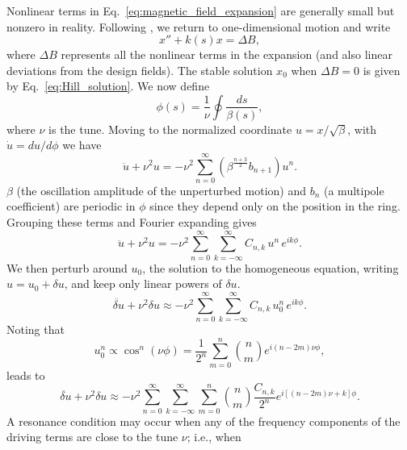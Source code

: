 Nonlinear terms in Eq.~\eqref{eq:magnetic_field_expansion} are generally small but nonzero in reality. Following \cite{LundLecture1}, we return to one-dimensional motion and write
%
\begin{equation}\label{eq:Hill_nonlinear}
    x'' + k(s) x = \Delta B,
\end{equation}
%
where $\Delta B$ represents all the nonlinear terms in the expansion (and also linear deviations from the design fields). The stable solution $x_0$ when $\Delta B = 0$ is given by Eq.~\eqref{eq:Hill_solution}. We now define
%
\begin{equation}
    \phi(s) = \frac{1}{\nu} \oint{\frac{ds}{\beta(s)}},
\end{equation}
%
where $\nu$ is the tune. Moving to the normalized coordinate $u = x / \sqrt{\beta}$, with $\dot{u} = du/d\phi$ we have
%
\begin{equation}\label{eq:pert1}
    \ddot{u} + \nu^2 u = -\nu^2 \sum_{n=0}^{\infty}{\left(\beta^{\frac{n+3}{2}} b_{n+1}\right) u^n}.
\end{equation}
%
$\beta$ (the oscillation amplitude of the unperturbed motion) and $b_n$ (a multipole coefficient) are periodic in $\phi$ since they depend only on the position in the ring. Grouping these terms and Fourier expanding gives
%
\begin{equation}
    \ddot{u} + \nu^2 u = -\nu^2 \sum_{n=0}^{\infty}\sum_{k=-\infty}^{\infty} C_{n,k} \, u^n \, e^{ik\phi}.
\end{equation} 
%
We then perturb around $u_0$, the solution to the homogeneous equation, writing $u = u_0 + \delta u$, and keep only linear powers of $\delta u$. 
%
\begin{equation}
    \ddot{\delta u} + \nu^2 \delta u \approx -\nu^2 \sum_{n=0}^{\infty}\sum_{k=-\infty}^{\infty} C_{n,k} \, u_0^n \, e^{ik\phi}.
\end{equation}
%
Noting that
%
\begin{equation}
    u_0^n \propto \cos^n(\nu\phi) = \frac{1}{2^n}\sum_{m=0}^{n} \binom{n}{m} e^{i(n-2m)\nu\phi},
\end{equation} 
%
leads to
%
\begin{equation}\label{eq:pert2}
    \ddot{\delta u} + \nu^2 \delta u \approx -\nu^2 \sum_{n=0}^{\infty}\sum_{k=-\infty}^{\infty} \sum_{m=0}^{n} {n \choose m} \frac{C_{n,k}}{2^n} e^{i\left[(n - 2m)\nu + k\right]\phi}.
\end{equation}
%
A resonance condition may occur when any of the frequency components of the driving terms are close to the tune $\nu$; i.e., when
